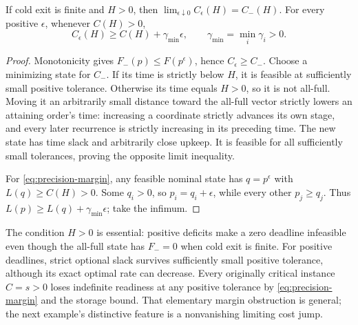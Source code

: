 \begin{proposition}
\label{prop:precision-limit}
If cold exit is finite and $H>0$, then
$\lim_{\epsilon\downarrow0}C_\epsilon(H)=C_-(H)$.
For every positive $\epsilon$, whenever $C(H)>0$,
\begin{equation}
 C_\epsilon(H)\geq C(H)+\gamma_{\min}\epsilon,
 \qquad \gamma_{\min}=\min_i\gamma_i>0.
 \label{eq:precision-margin}
\end{equation}
\end{proposition}

\begin{proof}
Monotonicity gives $F_-(p)\leq F(p^\epsilon)$, hence $C_\epsilon\geq C_-$.
Choose a minimizing state for $C_-$. If its time is strictly below $H$,
it is feasible at sufficiently small positive tolerance. Otherwise its
time equals $H>0$, so it is not all-full. Moving it an arbitrarily small
distance toward the all-full vector strictly lowers an attaining order's
time: increasing a coordinate strictly advances its own stage, and every
later recurrence is strictly increasing in its preceding time. The new
state has time slack and arbitrarily close upkeep. It is feasible for all
sufficiently small tolerances, proving the opposite limit inequality.

For \eqref{eq:precision-margin}, any feasible nominal state has
$q=p^\epsilon$ with $L(q)\geq C(H)>0$. Some $q_i>0$, so
$p_i=q_i+\epsilon$, while every other $p_j\geq q_j$. Thus
$L(p)\geq L(q)+\gamma_{\min}\epsilon$; take the infimum.
\end{proof}

The condition $H>0$ is essential: positive deficits make a zero deadline
infeasible even though the all-full state has $F_-=0$ when cold exit is
finite. For positive deadlines, strict optional slack survives sufficiently
small positive tolerance, although its exact optimal rate can decrease.
Every originally critical instance $C=s>0$ loses indefinite readiness at
any positive tolerance by \eqref{eq:precision-margin} and the storage
bound. That elementary margin obstruction is general; the next example's
distinctive feature is a nonvanishing limiting cost jump.

